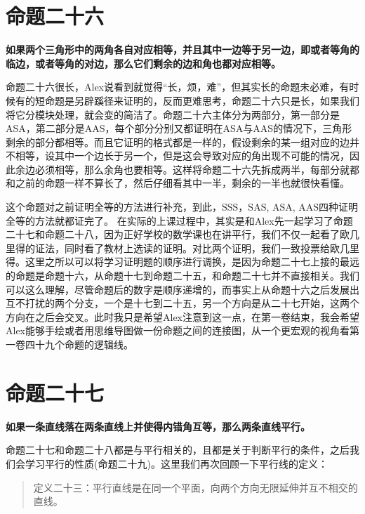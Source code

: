\documentclass[
]{book}
\begin{document}
\hypertarget{ux547dux9898ux4e8cux5341ux516d}{%
\section{命题二十六}\label{ux547dux9898ux4e8cux5341ux516d}}

\textbf{如果两个三角形中的两角各自对应相等，并且其中一边等于另一边，即或者等角的临边，或者等角的对边，那么它们剩余的边和角也都对应相等。}

命题二十六很长，Alex说看到就觉得``长，烦，难''，但其实长的命题未必难，有时候有的短命题是另辟蹊径来证明的，反而更难思考，命题二十六只是长，如果我们将它分模块处理，就会变的简洁了。命题二十六主体分为两部分，第一部分是ASA，第二部分是AAS，每个部分分别又都证明在ASA与AAS的情况下，三角形剩余的部分都相等。而且它证明的格式都是一样的，假设剩余的某一组对应的边并不相等，设其中一个边长于另一个，但是这会导致对应的角出现不可能的情况，因此余边必须相等，那么余角也要相等。这样将命题二十六先拆成两半，每部分就都和之前的命题一样不算长了，然后仔细看其中一半，剩余的一半也就很快看懂。

这个命题对之前证明全等的方法进行补充，到此，SSS，SAS, ASA, AAS四种证明全等的方法就都证完了。
在实际的上课过程中，其实是和Alex先一起学习了命题二十七和命题二十八，因为正好学校的数学课也在讲平行，我们不仅一起看了欧几里得的证法，同时看了教材上选读的证明。对比两个证明，我们一致投票给欧几里得。这里之所以可以将学习证明题的顺序进行调换，是因为命题二十七上接的最远的命题是命题十六，从命题十七到命题二十五，和命题二十七并不直接相关。我们可以这么理解，尽管命题后的数字是顺序递增的，而事实上从命题十六之后发展出互不打扰的两个分支，一个是十七到二十五，另一个方向是从二十七开始，这两个方向在之后会交叉。此时我只是希望Alex注意到这一点，在第一卷结束，我会希望Alex能够手绘或者用思维导图做一份命题之间的连接图，从一个更宏观的视角看第一卷四十九个命题的逻辑线。

\hypertarget{ux547dux9898ux4e8cux5341ux4e03}{%
\section{命题二十七}\label{ux547dux9898ux4e8cux5341ux4e03}}

\textbf{如果一条直线落在两条直线上并使得内错角互等，那么两条直线平行。}

命题二十七和命题二十八都是与平行相关的，且都是关于判断平行的条件，之后我们会学习平行的性质(命题二十九)。这里我们再次回顾一下平行线的定义：

\begin{quote}
定义二十三：平行直线是在同一个平面，向两个方向无限延伸并互不相交的直线。
\end{quote}
\end{document}
